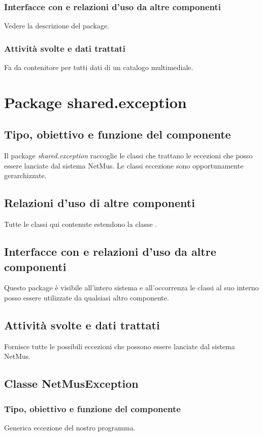 \subsubsection*{Interfacce con e relazioni d'uso da altre componenti}
Vedere la descrizione del package.
\subsubsection*{Attivit\`a svolte e dati trattati}
Fa da contenitore per tutti dati di un catalogo multimediale.

\section{Package shared.exception}
\subsection*{Tipo, obiettivo e funzione del componente}
Il package \emph{shared.exception} raccoglie le classi che trattano
le eccezioni che posso essere lanciate dal sistema NetMus. Le classi eccezione
sono opportunamente gerarchizzate. 
\subsection*{Relazioni d'uso di altre componenti}
Tutte le classi qui contenute estendono la classe .
\subsection*{Interfacce con e relazioni d'uso da altre componenti}
Questo package \`e visibile all'intero sistema e all'occorrenza le classi al suo
interno posso essere utilizzate da qualsiasi altro componente.
\subsection*{Attivit\`a svolte e dati trattati}
Fornisce tutte le possibili eccezioni che possono essere lanciate dal sistema
NetMus.

\subsection{Classe NetMusException}
\subsubsection*{Tipo, obiettivo e funzione del componente}
Generica eccezione del nostro programma.
